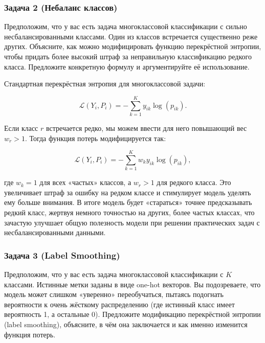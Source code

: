 \subsubsection*{Задача 2 (Небаланс классов)}

Предположим, что у вас есть задача многоклассовой классификации с сильно несбалансированными классами. Один из классов встречается существенно реже других. Объясните, как можно модифицировать функцию перекрёстной энтропии, чтобы придать более высокий штраф за неправильную классификацию редкого класса. Предложите конкретную формулу и аргументируйте её использование.

\begin{solution}
Стандартная перекрёстная энтропия для многоклассовой задачи:

$$
\mathcal{L}(Y_i, P_i) = -\sum_{k=1}^K y_{ik}\log(p_{ik}).
$$

Если класс $r$ встречается редко, мы можем ввести для него повышающий вес $w_r > 1$. Тогда функция потерь модифицируется так:

$$
\mathcal{L}(Y_i, P_i) = -\sum_{k=1}^K w_k y_{ik}\log(p_{ik}),
$$

где $w_k = 1$ для всех «частых» классов, а $w_r > 1$ для редкого класса. Это увеличивает штраф за ошибку на редком классе и стимулирует модель уделять ему больше внимания. В итоге модель будет «стараться» точнее предсказывать редкий класс, жертвуя немного точностью на других, более частых классах, что зачастую улучшает общую полезность модели при решении практических задач с несбалансированными данными.
\end{solution}

\subsubsection*{Задача 3 (Label Smoothing)}

Предположим, что у вас есть задача многоклассовой классификации с $K$ классами. Истинные метки заданы в виде one-hot векторов. Вы подозреваете, что модель может слишком «уверенно» переобучаться, пытаясь подогнать вероятности к очень жёсткому распределению (где истинный класс имеет вероятность 1, а остальные 0). Предложите модификацию перекрёстной энтропии (label smoothing), объясните, в чём она заключается и как именно изменится функция потерь.

